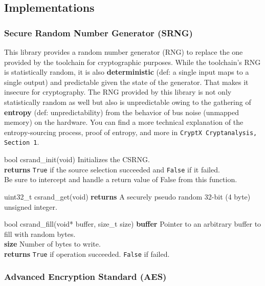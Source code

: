 \documentclass[titlepage]{article}
\begin{document}
		\subsection{Implementations}			
			\subsubsection{Secure Random Number Generator (SRNG)}
				This library provides a random number generator (RNG) to replace the one provided by the toolchain for cryptographic purposes. While the toolchain's RNG is statistically random, it is also \textbf{deterministic} (def: a single input maps to a single output) and predictable given the state of the generator. That makes it insecure for cryptography. The RNG provided by this library is not only statistically random as well but also is unpredictable owing to the gathering of \textbf{entropy} (def: unpredictability) from the behavior of bus noise (unmapped memory) on the hardware. You can find a more technical explanation of the entropy-sourcing process, proof of entropy, and more in \texttt{CryptX Cryptanalysis, Section 1}. 
			\vspace{5mm}
			\begin{functionspec}[]{bool csrand\_init(void)}\small
				Initializes the CSRNG.\\
				\textbf{returns} \texttt{True} if the source selection succeeded and \texttt{False} if it failed.\\
				Be sure to intercept and handle a return value of False from this function.
			\end{functionspec}
			\vspace{1mm}
			\begin{functionspec}[]{uint32\_t csrand\_get(void)}\small
				\textbf{returns} A securely pseudo random 32-bit (4 byte) unsigned integer.
			\end{functionspec}
			\vspace{1mm}
			\begin{functionspec}[]{bool csrand\_fill(void* buffer, size\_t size)}\small
				\textbf{buffer} Pointer to an arbitrary buffer to fill with random bytes.\\
				\textbf{size} Number of bytes to write.\\
				\textbf{returns} \texttt{True} if operation succeeded. \texttt{False} if failed.
			\end{functionspec}
		
		\subsubsection{Advanced Encryption Standard (AES)}
			
\end{document}
